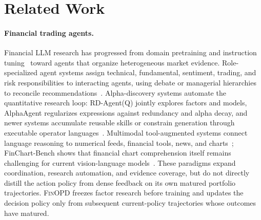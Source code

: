 \section{Related Work}
\label{sec:related}

\begingroup
\raggedbottom

\paragraph{Financial trading agents.}
Financial LLM research has progressed from domain pretraining and instruction tuning~\cite{wu2023bloomberggpt,liu2023fingpt,li2023large} toward agents that organize heterogeneous market evidence. Role-specialized agent systems assign technical, fundamental, sentiment, trading, and risk responsibilities to interacting agents, using debate or managerial hierarchies to reconcile recommendations~\cite{tradingagents2025,fincon2024,hedgeagents2025,finteam2025}. Alpha-discovery systems automate the quantitative research loop: RD-Agent(Q) jointly explores factors and models, AlphaAgent regularizes expressions against redundancy and alpha decay, and newer systems accumulate reusable skills or constrain generation through executable operator languages~\cite{rdagent2025,alphaagent2025,factorminer2026,hubble2026}. Multimodal tool-augmented systems connect language reasoning to numerical feeds, financial tools, news, and charts~\cite{finagent2024,finrobot2024}; FinChart-Bench shows that financial chart comprehension itself remains challenging for current vision-language models~\cite{finchartbench2025}. These paradigms expand coordination, research automation, and evidence coverage, but do not directly distill the action policy from dense feedback on its own matured portfolio trajectories. \textsc{FinOPD} freezes factor research before training and updates the decision policy only from subsequent current-policy trajectories whose outcomes have matured.

